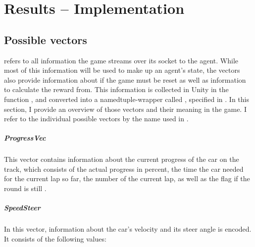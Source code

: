 \chapter{Results -- Implementation}

\label{ch:implementationresults}


\section{Possible vectors}

\label{ch:thevectors}


 refers to all information the game streams over its socket to the agent. While most of this information will be used to make up an agent's state, the vectors also provide information about if the game must be reset as well as information to calculate the reward from. This information is collected in Unity in the function , and converted into a namedtuple-wrapper called , specified in . In this section, I provide an overview of those vectors and their meaning in the game. I refer to the individual possible vectors by the name used in .

\paragraph{ProgressVec} This vector contains information about the current progress of the car on the track, which consists of the actual progress in percent, the time the car needed for the current lap so far, the number of the current lap, as well as the flag if the round is still .

\paragraph{SpeedSteer} In this vector, information about the car's velocity and its steer angle is encoded. It consists of the following values:

